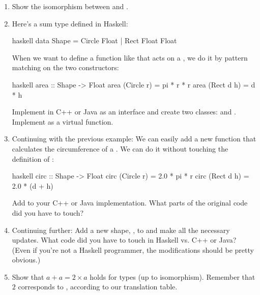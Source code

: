 \begin{enumerate}
  \tightlist
  \item
        Show the isomorphism between  and
        .
  \item
        Here's a sum type defined in Haskell:

        \begin{snip}{haskell}
data Shape = Circle Float 
           | Rect Float Float
\end{snip}
        When we want to define a function like  that acts on a
        , we do it by pattern matching on the two constructors:

        \begin{snip}{haskell}
area :: Shape -> Float
area (Circle r) = pi * r * r
area (Rect d h) = d * h
\end{snip}
        Implement  in C++ or Java as an interface and create two
        classes:  and . Implement  as
        a virtual function.
  \item
        Continuing with the previous example: We can easily add a new function
         that calculates the circumference of a .
        We can do it without touching the definition of :

        \begin{snip}{haskell}
circ :: Shape -> Float
circ (Circle r) = 2.0 * pi * r
circ (Rect d h) = 2.0 * (d + h)
\end{snip}
        Add  to your C++ or Java implementation. What parts of
        the original code did you have to touch?
  \item
        Continuing further: Add a new shape, , to
         and make all the necessary updates. What code did you
        have to touch in Haskell vs. C++ or Java? (Even if you're not a
        Haskell programmer, the modifications should be pretty obvious.)
  \item
        Show that $a + a = 2 \times a$ holds for types (up to
        isomorphism). Remember that $2$ corresponds to ,
        according to our translation table.
\end{enumerate}
